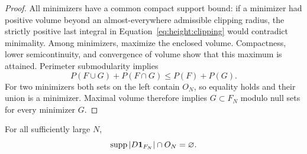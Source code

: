 \begin{proof}
All minimizers have a common compact support bound: if a minimizer had
positive volume beyond an almost-everywhere admissible clipping radius,
the strictly positive last integral in
Equation~\eqref{eq:height:clipping} would contradict minimality.
Among minimizers, maximize the enclosed volume.  Compactness,
lower semicontinuity, and convergence of volume show that this maximum
is attained.  Perimeter submodularity implies
\[
 P(F\cup G)+P(F\cap G)\le P(F)+P(G).
\]
For two minimizers both sets on the left contain $O_N$, so equality
holds and their union is a minimizer.  Maximal volume therefore implies
$G\subset F_N$ modulo null sets for every minimizer $G$.
\end{proof}

\begin{lemma}\label{lem:height:detachment}
For all sufficiently large $N$,
\begin{equation}\label{eq:height:detached}
 \operatorname{supp}|D\mathbf1_{F_N}|\cap O_N=\varnothing.
\end{equation}
\end{lemma}


